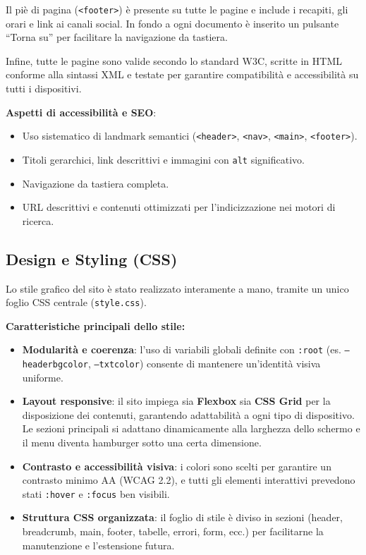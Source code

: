 \documentclass{article}
\begin{document}
Il piè di pagina (\texttt{<footer>}) è presente su tutte le pagine e include i recapiti, gli orari e link ai canali social. In fondo a ogni documento è inserito un pulsante “Torna su” per facilitare la navigazione da tastiera.

Infine, tutte le pagine sono valide secondo lo standard W3C, scritte in HTML conforme alla sintassi XML e testate per garantire compatibilità e accessibilità su tutti i dispositivi.

\medskip

\noindent
\textbf{Aspetti di accessibilità e SEO}:
\begin{itemize}
    \item Uso sistematico di landmark semantici (\texttt{<header>}, \texttt{<nav>}, \texttt{<main>}, \texttt{<footer>}).
    \item Titoli gerarchici, link descrittivi e immagini con \texttt{alt} significativo.
    \item Navigazione da tastiera completa.
    \item URL descrittivi e contenuti ottimizzati per l’indicizzazione nei motori di ricerca.
\end{itemize}

\vspace{1em}

\subsection{Design e Styling (CSS)}

Lo stile grafico del sito è stato realizzato interamente a mano, tramite un unico foglio CSS centrale (\texttt{style.css}).

\medskip

\noindent
\textbf{Caratteristiche principali dello stile:}
\begin{itemize}
    \item \textbf{Modularità e coerenza}: l’uso di variabili globali definite con \texttt{:root} (es. \texttt{--headerbgcolor}, \texttt{--txtcolor}) consente di mantenere un’identità visiva uniforme.
    \item \textbf{Layout responsive}: il sito impiega sia \textbf{Flexbox} sia \textbf{CSS Grid} per la disposizione dei contenuti, garantendo adattabilità a ogni tipo di dispositivo. Le sezioni principali si adattano dinamicamente alla larghezza dello schermo e il menu diventa hamburger sotto una certa dimensione.
    \item \textbf{Contrasto e accessibilità visiva}: i colori sono scelti per garantire un contrasto minimo AA (WCAG 2.2), e tutti gli elementi interattivi prevedono stati \texttt{:hover} e \texttt{:focus} ben visibili.
    \item \textbf{Struttura CSS organizzata}: il foglio di stile è diviso in sezioni (header, breadcrumb, main, footer, tabelle, errori, form, ecc.) per facilitarne la manutenzione e l’estensione futura.
\end{itemize}
\end{document}

